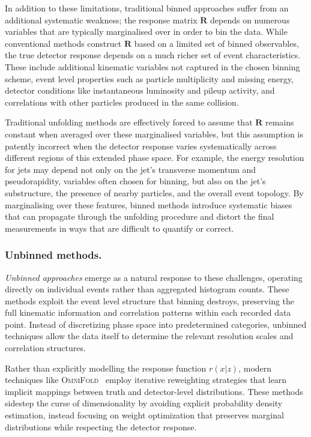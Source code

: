             In addition to these limitations, traditional binned approaches suffer from an additional systematic weakness;
            the response matrix \(\mathbf{R}\) depends on numerous variables that are typically marginalised over in order to bin the data.
            While conventional methods construct \(\mathbf{R}\) based on a limited set of binned observables, the true detector response depends on a much richer set of event characteristics.
            These include additional kinematic variables not captured in the chosen binning scheme, event level properties such as particle multiplicity and missing energy, detector conditions like instantaneous luminosity and pileup activity, and correlations with other particles produced in the same collision.
            
            Traditional unfolding methods are effectively forced to assume that \(\mathbf{R}\) remains constant when averaged over these marginalised variables, but this assumption is patently incorrect when the detector response varies systematically across different regions of this extended phase space.
            For example, the energy resolution for jets may depend not only on the jet's transverse momentum and pseudorapidity, variables often chosen for binning, but also on the jet's substructure, the presence of nearby particles, and the overall event topology.
            By marginalising over these features, binned methods introduce systematic biases that can propagate through the unfolding procedure and distort the final measurements in ways that are difficult to quantify or correct.

        \subsubsection{Unbinned methods.}
        \emph{Unbinned approaches} emerge as a natural response to these challenges, operating directly on individual events rather than aggregated histogram counts.
        These methods exploit the event level structure that binning destroys, preserving the full kinematic information and correlation patterns within each recorded data point.
        Instead of discretizing phase space into predetermined categories, unbinned techniques allow the data itself to determine the relevant resolution scales and correlation structures.
        
        Rather than explicitly modelling the response function \(r(x|z)\), modern techniques like \textsc{OmniFold}~\cite{andreassen_omnifold_2020} employ iterative reweighting strategies that learn implicit mappings between truth and detector-level distributions.
        These methods sidestep the curse of dimensionality by avoiding explicit probability density estimation, instead focusing on weight optimization that preserves marginal distributions while respecting the detector response.

